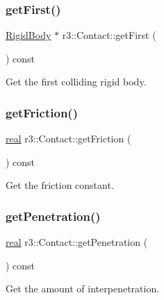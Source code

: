 \mbox{\label{classr3_1_1_contact_adf157981ebfd1552521afe7b25e9239c}} 
\subsubsection{\texorpdfstring{get\+First()}{getFirst()}}
{\footnotesize\ttfamily \mbox{\hyperlink{classr3_1_1_rigid_body}{Rigid\+Body}} $\ast$ r3\+::\+Contact\+::get\+First (\begin{DoxyParamCaption}{ }\end{DoxyParamCaption}) const}

Get the first colliding rigid body. \mbox{\label{classr3_1_1_contact_a1a547c3852733960001cc5fe0fe06790}} 
\subsubsection{\texorpdfstring{get\+Friction()}{getFriction()}}
{\footnotesize\ttfamily \mbox{\hyperlink{namespacer3_ab2016b3e3f743fb735afce242f0dc1eb}{real}} r3\+::\+Contact\+::get\+Friction (\begin{DoxyParamCaption}{ }\end{DoxyParamCaption}) const}

Get the friction constant. \mbox{\label{classr3_1_1_contact_afe0f0a9a42b4b1f8bd8a61f0b6a4afdd}} 
\subsubsection{\texorpdfstring{get\+Penetration()}{getPenetration()}}
{\footnotesize\ttfamily \mbox{\hyperlink{namespacer3_ab2016b3e3f743fb735afce242f0dc1eb}{real}} r3\+::\+Contact\+::get\+Penetration (\begin{DoxyParamCaption}{ }\end{DoxyParamCaption}) const}

Get the amount of interpenetration. \mbox{\label{classr3_1_1_contact_ade5794f7055fb30ff52f9193b92c6bf0}} 
